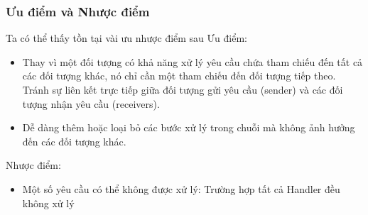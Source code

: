 \subsubsection{Ưu điểm và Nhược điểm}
Ta có thể thấy tồn tại vài ưu nhược điểm sau
Ưu điểm:
\begin{itemize}
    \item Thay vì một đối tượng có khả năng xử lý yêu cầu chứa tham chiếu đến tất cả các đối tượng khác, nó chỉ cần một tham chiếu đến đối tượng tiếp theo. Tránh sự liên kết trực tiếp giữa đối tượng gửi yêu cầu (sender) và các đối tượng nhận yêu cầu (receivers).
    \item Dễ dàng thêm hoặc loại bỏ các bước xử lý trong chuỗi mà không ảnh hưởng đến các đối tượng khác.
\end{itemize}
Nhược điểm:
\begin{itemize}
    \item Một số yêu cầu có thể không được xử lý: Trường hợp tất cả Handler đều không xử lý
\end{itemize}

